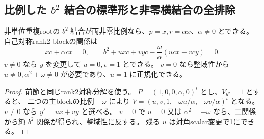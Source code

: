 \subsection{比例した $b^2$ 結合の標準形と非零横結合の全排除}
\label{subsec:cubic-third-root-nonunit-proportional-open}
\begin{proposition}[比例self結合の二つの必要標準形]
\label{prop:cubic-third-root-nonunit-proportional-self}
非単位重複rootの $b^2$ 結合が両非零比例なら、$p=x,r=\alpha x$、$\alpha\ne0$ とできる。
自己対称rank2 blockの関係は
\[
 xc+\alpha cx=0,\qquad
 b^2+u xc+v yc-\frac\omega\alpha(u cx+v cy)=0.
\]
$v\ne0$ なら $y$ を変更して $u=0,v=1$ とできる。
$v=0$ なら整域性から $u\ne0,\alpha^2+\omega\ne0$ が必要であり、$u=1$ に正規化できる。
\end{proposition}
\begin{proof}
前節と同じrank2対称分解を使う。
$P=(1,0,0,\alpha,0)^t$ とし、$V_{b^2}=1$ とすると、
二つの主blockの比例 $-\omega$ により
$V=(u,v,1,-\omega u/\alpha,-\omega v/\alpha)^t$ となる。
$v\ne0$ なら $y'=ux+vy$ と選べる。
$v=0$ で $u=0$ 又は $\alpha^2=-\omega$ なら、二関係から純 $b^2$ 関係が得られ、整域性に反する。
残る $u$ は対角scalar変更で1にできる。
\end{proof}

